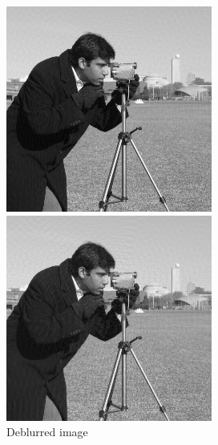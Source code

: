 \documentclass[../main]{subfiles}
\begin{document}
\begin{figure}[htpb]
    \centering
    \begin{minipage}[b]{.49\hsize}
        \centering
        \includegraphics[width=\linewidth]{figs/cameraman_deblurred_2.png}
    \end{minipage}
    \begin{minipage}[b]{.49\hsize}
        \centering
        \includegraphics[width=\linewidth]{figs/cameraman_deblurred_11.png}
    \end{minipage}
    \caption{Deblurred image}
\end{figure}
\end{document}
